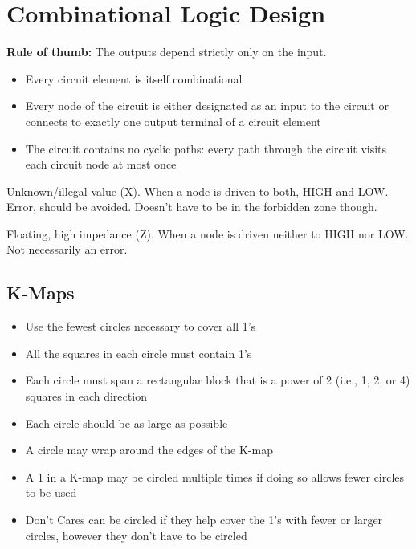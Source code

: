 \documentclass[11pt]{article}
\begin{document}
\section{Combinational Logic Design}

\textbf{Rule of thumb:} The outputs depend strictly only on the input.

\begin{itemize}[noitemsep]
	\item Every circuit element is itself combinational
	\item Every node of the circuit is either designated as an input to the circuit or connects to exactly one output terminal of a circuit element
	\item The circuit contains no cyclic paths: every path through the circuit visits each circuit node at most once
\end{itemize}

\begin{description}[labelindent=16pt,style=multiline,leftmargin=4cm, noitemsep]
	\item[Contention:] Unknown/illegal value (X). When a node is driven to both, HIGH and LOW. Error, should be avoided. Doesn't have to be in the forbidden zone though.
	\item[Floating Value:] Floating, high impedance (Z). When a node is driven neither to HIGH nor LOW. Not necessarily an error.
\end{description}

\subsection{K-Maps}

\begin{itemize}[noitemsep]
	\item Use the fewest circles necessary to cover all 1's
	\item All the squares in each circle must contain 1's
	\item Each circle must span a rectangular block that is a power of 2 (i.e., 1, 2, or 4) squares in each direction
	\item Each circle should be as large as possible
	\item A circle may wrap around the edges of the K-map
	\item A 1 in a K-map may be circled multiple times if doing so allows fewer circles to be used
	\item Don't Cares can be circled if they help cover the 1’s with fewer or larger circles, however they don't have to be circled
\end{itemize}
\end{document}
